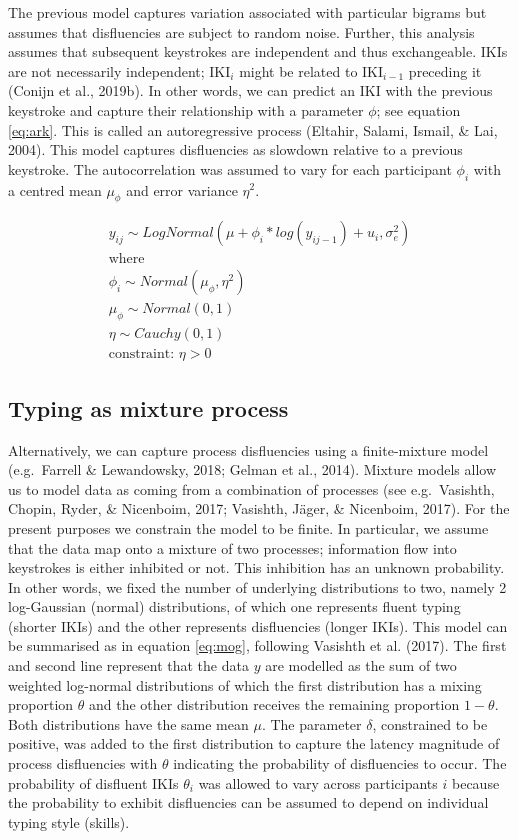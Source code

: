 \documentclass[
  english,
  man,mask,floatsintext]{apa7}
\begin{document}
The previous model captures variation associated with particular bigrams but assumes that disfluencies are subject to random noise. Further, this analysis assumes that subsequent keystrokes are independent and thus exchangeable. IKIs are not necessarily independent; IKI\(_{i}\) might be related to IKI\(_{i-1}\) preceding it (Conijn et al., 2019b). In other words, we can predict an IKI with the previous keystroke and capture their relationship with a parameter \(\phi\); see equation \ref{eq:ark}. This is called an autoregressive process (Eltahir, Salami, Ismail, \& Lai, 2004). This model captures disfluencies as slowdown relative to a previous keystroke. The autocorrelation was assumed to vary for each participant \(\phi_i\) with a centred mean \(\mu_{\phi}\) and error variance \(\eta^2\).

\[
\tag{6}
\begin{aligned}
y_{ij} \sim LogNormal(\mu + \phi_i*log(y_{ij-1}) + u_i, \sigma_e^2)\\
\text{where}\\
\phi_i \sim Normal(\mu_{\phi}, \eta^2)\\
\mu_{\phi} \sim Normal(0, 1)\\
\eta \sim Cauchy(0, 1)\\
\text{constraint: }\eta >0 
\end{aligned}
\label{eq:ark}
\]

\hypertarget{typing-as-mixture-process}{%
\subsection{Typing as mixture process}\label{typing-as-mixture-process}}

Alternatively, we can capture process disfluencies using a finite-mixture model (e.g.~Farrell \& Lewandowsky, 2018; Gelman et al., 2014). Mixture models allow us to model data as coming from a combination of processes (see e.g.~Vasishth, Chopin, Ryder, \& Nicenboim, 2017; Vasishth, Jäger, \& Nicenboim, 2017). For the present purposes we constrain the model to be finite. In particular, we assume that the data map onto a mixture of two processes; information flow into keystrokes is either inhibited or not. This inhibition has an unknown probability. In other words, we fixed the number of underlying distributions to two, namely 2 log-Gaussian (normal) distributions, of which one represents fluent typing (shorter IKIs) and the other represents disfluencies (longer IKIs). This model can be summarised as in equation \ref{eq:mog}, following Vasishth et al. (2017). The first and second line represent that the data \(y\) are modelled as the sum of two weighted log-normal distributions of which the first distribution has a mixing proportion \(\theta\) and the other distribution receives the remaining proportion \(1-\theta\). Both distributions have the same mean \(\mu\). The parameter \(\delta\), constrained to be positive, was added to the first distribution to capture the latency magnitude of process disfluencies with \(\theta\) indicating the probability of disfluencies to occur. The probability of disfluent IKIs \(\theta_i\) was allowed to vary across participants \(i\) because the probability to exhibit disfluencies can be assumed to depend on individual typing style (skills).
\end{document}
